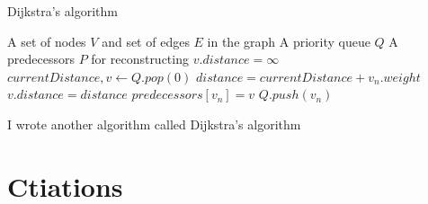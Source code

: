 \documentclass{article}
\begin{document}
\begin{algorithm}[t]
\caption{Dijkstra's algorithm}
\begin{algorithmic}[1]
\State A set of nodes $V$ and set of edges $E$ in the graph
\State A priority queue $Q$ 
\State A predecessors $P$  for reconstructing
    \State $v.distance = \infty$
\EndFor
{}
    $currentDistance, v \gets Q.pop(0)$
        \State $distance = currentDistance + v_n.weight$
            \State $v.distance = distance$
            \State $predecessors[v_n] = v$
            \State $Q.push(v_n)$
        \EndIf
    \EndFor
\EndWhile
\end{algorithmic}
\end{algorithm}

I wrote another algorithm called Dijkstra's algorithm

\section{Ctiations}
\medskip
\printbibliography
\end{document}
